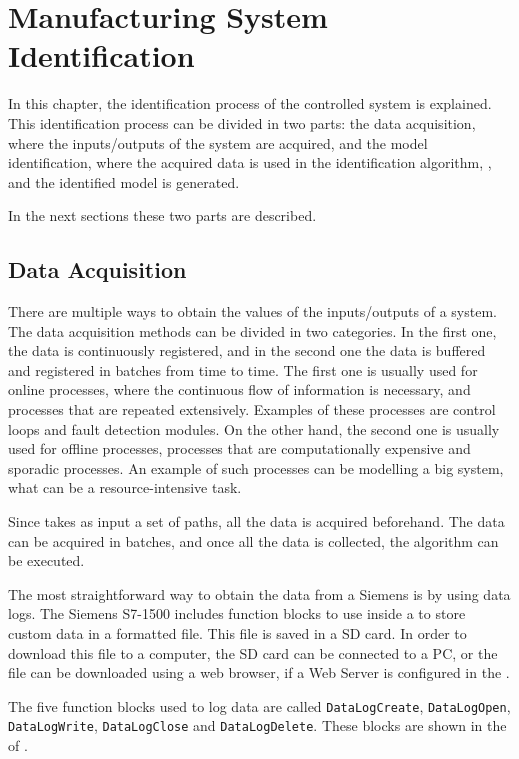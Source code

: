 
\chapter{Manufacturing System Identification}
\label{cha:ident}
In this chapter, the identification process of the controlled system is
explained. This identification process can be divided in two parts: the data acquisition, where the inputs\slash outputs of the system are
  acquired, and the model identification, where the acquired data is
  used in the identification algorithm, , and the
  identified model is generated.
 
In the next sections these two parts are described.

\section{Data Acquisition}
There are multiple ways to obtain the values of the
inputs\slash outputs of a system. The data acquisition methods can be divided in two categories. In the first one,
the data is continuously registered, and in the second one the data is buffered
and registered in batches from time to time.
The first one is usually used for online processes, where the continuous flow of
information is necessary, and processes that are repeated
extensively. Examples of these processes are control loops and fault
detection modules. On the other hand, the second one is usually used for offline
processes, processes that are computationally expensive and sporadic processes.
An example of such processes can be modelling a big system, what can be a
resource-intensive task.

Since  takes as input a set of paths, all the data is
acquired beforehand. The data can
be acquired in batches, and once all the data is collected, the algorithm can be
executed.

The most straightforward way to obtain the data from a Siemens \PLC{} is by
using data logs. The Siemens \PLC{} S7-1500 includes function blocks to
use inside a \LD{} to store custom data in a \CSV{} formatted file. This file is
saved in a SD card. In order to download this file to a computer, the SD card can be connected to a PC,
or the file can be downloaded using a web browser, if a Web Server is configured in the
\PLC.

The five function blocks used to log data are called
\verb|DataLogCreate|,
\verb|DataLogOpen|, \verb|DataLogWrite|, \verb|DataLogClose| and \verb|DataLogDelete|.
These blocks are shown in the \LD{} of .


